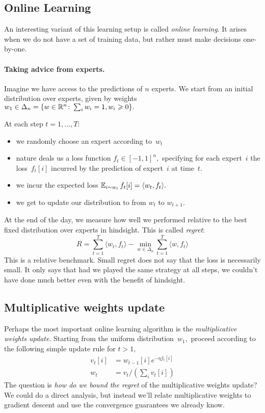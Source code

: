\subsection{Online Learning}

An interesting variant of this learning setup is called \emph{online learning}.
It arises when we do not have a set of training data, but rather must make
decisions one-by-one.

\paragraph{Taking advice from experts.}
Imagine we have access to the predictions of $n$ experts. 
We start from an initial distribution over experts, given by
weights~$w_1\in\Delta_n = \{ w\in\mathbb{R}^n\colon \sum_i w_i=1, w_i\geqslant0\}.$

At each step $t = 1, \ldots, T$:
\begin{itemize}
    \item we randomly choose an expert according to~$w_t$
    \item nature deals us a loss function $f_t\in[-1,1]^n,$ specifying for each
expert~$i$ the loss~$f_t[i]$ incurred by the prediction of expert~$i$ at
time~$t.$
    \item we incur the expected loss $\operatorname*{\mathbb{E}}_{i\sim w_t}f_t[i]=\langle
w_t,f_t\rangle.$
    \item we get to update our distribution to from $w_t$ to $w_{t+1}.$
\end{itemize}

At the end of the day, we measure how well we performed relative to the best
fixed distribution over experts in hindsight. This is called \emph{regret}:
\begin{equation*}
   R = \sum^T_{t = 1} \langle w_{t}, f_t \rangle - \min_{w \in \Delta_n} \sum^{T}_{t = 1} \langle w, f_t \rangle
\end{equation*}
This is a relative benchmark. Small regret does not say that the loss is necessarily
small. It only says that had we played the same strategy at all steps, we
couldn't have done much better even with the benefit of hindsight.

\subsection{Multiplicative weights update}

Perhaps the most important online learning algorithm is the \emph{multiplicative
weights update}. Starting from the uniform distribution~$w_1,$ proceed according
to the following simple update rule for $t>1,$
\begin{align*}
    v_t[i] &= w_{t-1}[i]e^{-\eta f_t[i]} \tag{exponential weights update}\\
    w_t &= v_t/(\textstyle\sum_i v_t[i]) \tag{normalize}
\end{align*}
The question is \textit{how do we bound the regret} of the multiplicative
weights update? We could do a direct analysis, but instead we'll relate
multiplicative weights to gradient descent and use the convergence guarantees
we already know.

